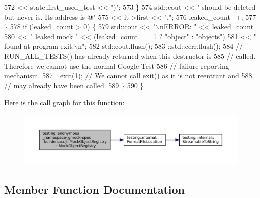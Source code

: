 \begin{DoxyCode}
572              << state.first\_used\_test << \textcolor{stringliteral}{")"};
573       \}
574       std::cout << \textcolor{stringliteral}{" should be deleted but never is. Its address is @"}
575            << it->first << \textcolor{stringliteral}{"."};
576       leaked\_count++;
577     \}
578     \textcolor{keywordflow}{if} (leaked\_count > 0) \{
579       std::cout << \textcolor{stringliteral}{"\(\backslash\)nERROR: "} << leaked\_count
580            << \textcolor{stringliteral}{" leaked mock "} << (leaked\_count == 1 ? \textcolor{stringliteral}{"object"} : \textcolor{stringliteral}{"objects"})
581            << \textcolor{stringliteral}{" found at program exit.\(\backslash\)n"};
582       std::cout.flush();
583       ::std::cerr.flush();
584       \textcolor{comment}{// RUN\_ALL\_TESTS() has already returned when this destructor is}
585       \textcolor{comment}{// called.  Therefore we cannot use the normal Google Test}
586       \textcolor{comment}{// failure reporting mechanism.}
587       \_exit(1);  \textcolor{comment}{// We cannot call exit() as it is not reentrant and}
588                  \textcolor{comment}{// may already have been called.}
589     \}
590   \}
\end{DoxyCode}
Here is the call graph for this function\+:
\nopagebreak
\begin{figure}[H]
\begin{center}
\leavevmode
\includegraphics[width=350pt]{classtesting_1_1anonymous__namespace_02gmock-spec-builders_8cc_03_1_1MockObjectRegistry_a8aca5657a32a192a6042106bfd78bf84_cgraph}
\end{center}
\end{figure}


\subsection{Member Function Documentation}
\mbox{\label{classtesting_1_1anonymous__namespace_02gmock-spec-builders_8cc_03_1_1MockObjectRegistry_a9fcca86257d75633185af67a47c72e9a}} 
